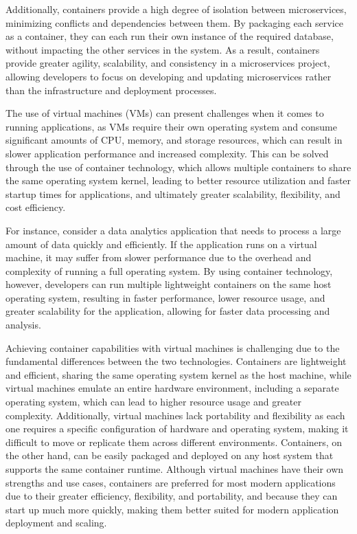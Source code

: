 Additionally, containers provide a high degree of isolation between microservices, minimizing conflicts and dependencies between them. By packaging each service as a container, they can each run their own instance of the required database, without impacting the other services in the system. As a result, containers provide greater agility, scalability, and consistency in a microservices project, allowing developers to focus on developing and updating microservices rather than the infrastructure and deployment processes.


The use of virtual machines (VMs) can present challenges when it comes to running applications, as VMs require their own operating system and consume significant amounts of CPU, memory, and storage resources, which can result in slower application performance and increased complexity. This can be solved through the use of container technology, which allows multiple containers to share the same operating system kernel, leading to better resource utilization and faster startup times for applications, and ultimately greater scalability, flexibility, and cost efficiency.


For instance, consider a data analytics application that needs to process a large amount of data quickly and efficiently. If the application runs on a virtual machine, it may suffer from slower performance due to the overhead and complexity of running a full operating system. By using container technology, however, developers can run multiple lightweight containers on the same host operating system, resulting in faster performance, lower resource usage, and greater scalability for the application, allowing for faster data processing and analysis.


Achieving container capabilities with virtual machines is challenging due to the fundamental differences between the two technologies. Containers are lightweight and efficient, sharing the same operating system kernel as the host machine, while virtual machines emulate an entire hardware environment, including a separate operating system, which can lead to higher resource usage and greater complexity. Additionally, virtual machines lack portability and flexibility as each one requires a specific configuration of hardware and operating system, making it difficult to move or replicate them across different environments. Containers, on the other hand, can be easily packaged and deployed on any host system that supports the same container runtime. Although virtual machines have their own strengths and use cases, containers are preferred for most modern applications due to their greater efficiency, flexibility, and portability, and because they can start up much more quickly, making them better suited for modern application deployment and scaling.


